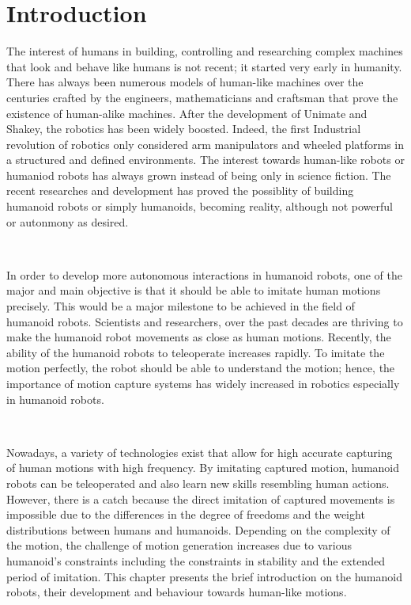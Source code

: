 \chapter{Introduction}

The interest of humans in building, controlling and researching complex machines that look and behave like humans is not 
recent; it started very early in humanity. There has always been numerous models of human-like machines over the centuries 
crafted by the engineers, mathematicians and craftsman that prove the existence of human-alike machines. After the development 
of Unimate and Shakey, the robotics has been widely boosted. Indeed, the first Industrial revolution of robotics only considered 
arm manipulators and wheeled platforms in a structured and defined environments. The interest towards human-like robots or humaniod 
robots has always grown instead of being only in science fiction. The recent researches and development has proved the possiblity
of building humanoid robots or simply humanoids, becoming reality, although not powerful or autonmony as desired. 

~

In order to develop more autonomous interactions in humanoid robots, one of the major and main objective is that it should
be able to imitate human motions precisely. This would be a major milestone to be achieved in the field of humanoid robots.
Scientists and researchers, over the past decades are thriving to make the humanoid robot movements as close as human 
motions. Recently, the ability of the humanoid robots to teleoperate increases rapidly. To imitate the motion perfectly,
the robot should be able to understand the motion; hence, the importance of motion capture systems has widely increased
in robotics especially in humanoid robots.

~

Nowadays, a variety of technologies exist that allow for high accurate capturing of human motions with high frequency. 
By imitating captured motion, humanoid robots can be teleoperated and also learn new skills resembling human actions. 
However, there is a catch because the direct imitation of captured movements is impossible due to the differences in 
the degree of freedoms and the weight distributions between humans and humanoids. Depending on the complexity of the 
motion, the challenge of motion generation increases due to various humanoid's constraints including the constraints in 
stability and the extended period of imitation. This chapter presents the brief introduction on the humanoid robots, 
their development and behaviour towards human-like motions.


